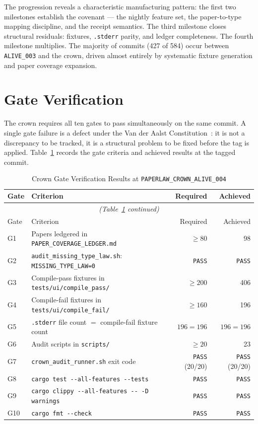 The progression reveals a characteristic manufacturing pattern: the first two
milestones establish the covenant --- the nightly feature set, the paper-to-type
mapping discipline, and the receipt semantics. The third milestone closes
structural residuals: fixtures, \texttt{.stderr} parity, and ledger completeness.
The fourth milestone multiplies. The majority of commits (427 of 584) occur
between \texttt{ALIVE\_003} and the crown, driven almost entirely by systematic
fixture generation and paper coverage expansion.

\section{Gate Verification}
\label{sec:crown-gates}

The crown requires all ten gates to pass simultaneously on the same commit. A
single gate failure is a defect under the Van der Aalst Constitution~\cite{vanderaalst2004workflow}: it is not a
discrepancy to be tracked, it is a structural problem to be fixed before the tag
is applied. Table~\ref{tab:crown-gates} records the gate criteria and achieved
results at the tagged commit.

\begin{longtable}{@{}llrr@{}}
\caption{Crown Gate Verification Results at \texttt{PAPERLAW\_CROWN\_ALIVE\_004}}
\label{tab:crown-gates}\\
\toprule
Gate & Criterion & Required & Achieved \\
\midrule
\endfirsthead
\multicolumn{4}{c}{\small\itshape (Table~\ref{tab:crown-gates} continued)}\\
\toprule
Gate & Criterion & Required & Achieved \\
\midrule
\endhead
\bottomrule
\endlastfoot
G1  & Papers ledgered in \texttt{PAPER\_COVERAGE\_LEDGER.md} & $\geq 80$   & 98   \\
G2  & \texttt{audit\_missing\_type\_law.sh}: \texttt{MISSING\_TYPE\_LAW=0} & \texttt{PASS} & \texttt{PASS} \\
G3  & Compile-pass fixtures in \texttt{tests/ui/compile\_pass/}  & $\geq 200$  & 406  \\
G4  & Compile-fail fixtures in \texttt{tests/ui/compile\_fail/}  & $\geq 160$  & 196  \\
G5  & \texttt{.stderr} file count $=$ compile-fail fixture count  & $196 = 196$ & $196 = 196$ \\
G6  & Audit scripts in \texttt{scripts/}                         & $\geq 20$   & 23   \\
G7  & \texttt{crown\_audit\_runner.sh} exit code                 & \texttt{PASS} (20/20) & \texttt{PASS} (20/20) \\
G8  & \texttt{cargo test -{}-all-features -{}-tests}             & \texttt{PASS} & \texttt{PASS} \\
G9  & \texttt{cargo clippy -{}-all-features -{}- -D warnings}    & \texttt{PASS} & \texttt{PASS} \\
G10 & \texttt{cargo fmt -{}-check}                               & \texttt{PASS} & \texttt{PASS} \\
\end{longtable}

